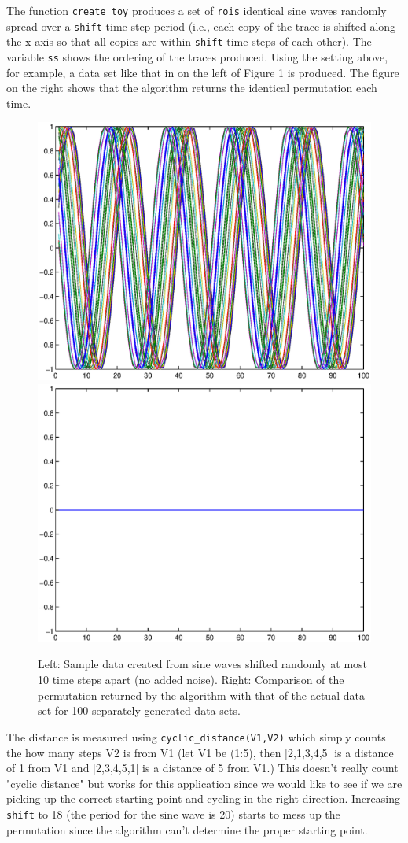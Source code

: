 \documentclass[11pt]{article}
\begin{document}
The function \verb|create_toy| produces a set of \verb|rois| identical sine waves randomly spread over a \verb|shift| time step period (i.e., each copy of the trace is shifted along the x axis so that all copies are within \verb|shift| time steps of each other). The variable \verb|ss| shows the ordering of the traces produced. Using the setting above, for example, a data set like that in on the left of Figure 1 is produced. The figure on the right shows that the algorithm returns the identical permutation each time.
\begin{figure}
\includegraphics[width=.45\textwidth]{pictures/1_24_16/sine_toy.eps}
\includegraphics[width=.45\textwidth]{pictures/1_24_16/sine_cpsn_noNoise.eps}
\caption{Left: Sample data created from sine waves shifted randomly at most 10 time steps apart (no added noise). Right: Comparison of the permutation returned by the algorithm with that of the actual data set for 100 separately generated data sets.}
\end{figure}
The distance is measured using \verb|cyclic_distance(V1,V2)| which simply counts the how many steps V2 is from V1 (let V1 be (1:5), then [2,1,3,4,5] is a distance of 1 from V1 and [2,3,4,5,1] is a distance of 5 from V1.) This doesn't really count "cyclic distance" but works for this application since we would like to see if we are picking up the correct starting point and cycling in the right direction. 
Increasing \verb|shift| to 18 (the period for the sine wave is 20) starts to mess up the permutation since the algorithm can't determine the proper starting point.
\end{document}
